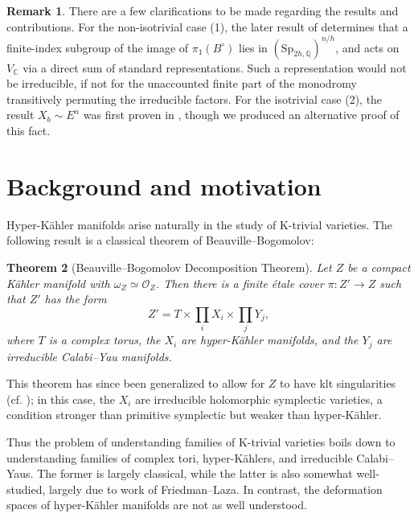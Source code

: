 \documentclass[12pt]{amsart}
\newcommand{\Q}{\mathbb{Q}}
\newcommand{\C}{\mathbb{C}}
\newtheorem{theorem}{Theorem}[section]
\theoremstyle{definition}
\newtheorem{remark}[theorem]{Remark}
\numberwithin{equation}{section}
\begin{document}
\begin{remark} \label{remark-monodromy}
There are a few clarifications to be made regarding the results and contributions. 
For the non-isotrivial case (1), the later result of  
determines that a finite-index subgroup of the image of \(\pi_1(B^\circ)\) lies in 
\((\mathrm{Sp}_{2h, \Q})^{n/h}\), and acts on \(V_\C\) via a direct sum of standard representations. 
Such a representation would not be irreducible, if not for the unaccounted finite 
part of the monodromy transitively permuting the irreducible factors.
For the isotrivial case (2), the result \(X_b \sim E^n\) was first proven in 
\cite{kim-laza-martin24}, though we produced an alternative proof of this fact. 
\end{remark}




\section{Background and motivation}

Hyper-K\"ahler manifolds arise naturally in the study of K-trivial varieties. 
The following result is a classical theorem of Beauville--Bogomolov:
\begin{theorem}[Beauville--Bogomolov Decomposition Theorem]
    Let \(Z\) be a compact K\"ahler manifold with \(\omega_Z \simeq \mathcal{O}_Z\). 
    Then there is a finite \'etale cover \(\pi: Z' \to Z\) such that \(Z'\) has the form 
    \begin{equation*}
        Z' = T \times \prod_i X_i \times \prod_j Y_j,
    \end{equation*}
    where \(T\) is a complex torus, the \(X_i\) are hyper-K\"ahler manifolds, and 
    the \(Y_j\) are irreducible Calabi--Yau manifolds.
\end{theorem}

This theorem has since been generalized to allow for \(Z\) to have klt singularities 
(cf. \cite{bgl22}); in this case, the \(X_i\) are irreducible holomorphic 
symplectic varieties, a condition stronger than primitive symplectic but weaker than 
hyper-K\"ahler.

Thus the problem of understanding families of K-trivial varieties boils down to 
understanding families of complex tori, hyper-K\"ahlers, and irreducible Calabi--Yaus. 
The former is largely classical, while the latter is also somewhat well-studied, largely 
due to work of Friedman--Laza. In contrast, the deformation spaces of hyper-K\"ahler manifolds 
are not as well understood.
\end{document}
